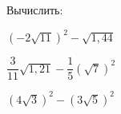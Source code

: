 \begin{class}[number=1]
\begin{listofex}[resume]
\begin{enumcols}[itemcolumns=3]
		\end{enumcols}
		\item Вычислить:
		\begin{enumcols}[itemcolumns=3]
			\item \( (-2\sqrt{11})^2-\sqrt{1,44} \)
			\item \( \dfrac{3}{11}\sqrt{1,21}-\dfrac{1}{5}(\sqrt{7})^2 \)
			\item \( (4\sqrt{3})^2-(3\sqrt{5})^2 \)
		\end{enumcols}
	\end{listofex}
\end{class}
%
%
